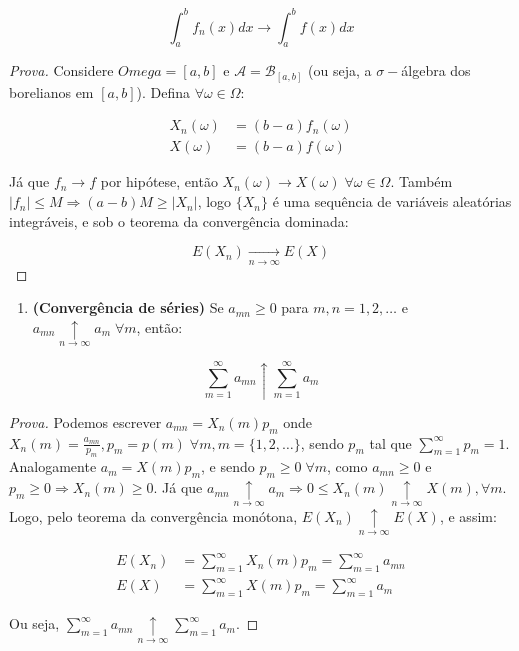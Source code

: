 \documentclass[
]{article}
\providecommand{\tightlist}{%
  \setlength{\itemsep}{0pt}\setlength{\parskip}{0pt}}
\theoremstyle{definition}
\theoremstyle{definition}
\theoremstyle{definition}
\theoremstyle{definition}
\theoremstyle{remark}
\begin{document}
\begin{equation*}
\int_{a}^{b}f_{n}(x)dx \to \int_{a}^{b}f(x)dx
\end{equation*}

\begin{proof}[Prova]
Considere \(Omega = [a,b]\) e \(\mathcal{A} = \mathcal{B}_{[a,b]}\) (ou seja, a \(\sigma-\)álgebra dos borelianos em \([a,b]\)). Defina \(\forall \omega \in \Omega\):

\begin{align*}
X_{n}(\omega) &= (b-a)f_{n}(\omega) \\
X(\omega) &= (b-a)f(\omega)
\end{align*}

Já que \(f_{n} \to f\) por hipótese, então \(X_{n}(\omega) \to X(\omega) \; \forall \omega \in \Omega\). Também \(|f_{n}| \le M \Rightarrow (a-b)M \ge |X_{n}|\), logo \(\{X_{n}\}\) é uma sequência de variáveis aleatórias integráveis, e sob o teorema da convergência dominada:

\begin{equation*}
E(X_{n}) \underset{n \to \infty}{\longrightarrow}E(X)
\end{equation*}
\end{proof}

\begin{enumerate}
\def\labelenumi{\arabic{enumi}.}
\setcounter{enumi}{3}
\tightlist
\item
  \textbf{(Convergência de séries)} Se \(a_{mn} \ge 0\) para \(m,n = 1,2,\ldots\) e \(a_{mn} \underset{n \to \infty}{\uparrow}a_{m} \; \forall m\), então:
\end{enumerate}

\begin{equation*}
\sum_{m=1}^{\infty}a_{mn} \uparrow \sum_{m=1}^{\infty}a_{m}
\end{equation*}

\begin{proof}[Prova]
Podemos escrever \(a_{mn} = X_{n}(m)p_{m}\) onde \(X_{n}(m) = \frac{a_{mn}}{p_{m}}, p_{m} = p(m) \; \forall m, m = \{1,2,\ldots\}\), sendo \(p_{m}\) tal que \(\sum_{m=1}^{\infty}p_{m} = 1\). Analogamente \(a_{m} = X(m)p_{m}\), e sendo \(p_{m} \ge 0 \; \forall m\), como \(a_{mn} \ge 0\) e \(p_{m} \ge 0 \Rightarrow X_{n}(m) \ge 0\). Já que \(a_{mn} \underset{n \to \infty}{\uparrow}a_{m} \Rightarrow 0 \le X_{n}(m) \underset{n \to \infty}{\uparrow} X(m), \forall m\). Logo, pelo teorema da convergência monótona, \(E(X_{n}) \underset{n \to \infty}{\uparrow} E(X)\), e assim:

\begin{align*}
E(X_{n}) &= \sum_{m=1}^{\infty}X_{n}(m)p_{m} = \sum_{m=1}^{\infty}a_{mn} \\
E(X) &= \sum_{m=1}^{\infty}X(m)p_{m} = \sum_{m=1}^{\infty}a_{m}
\end{align*}

Ou seja, \(\sum_{m=1}^{\infty}a_{mn} \underset{n \to \infty}{\uparrow} \sum_{m=1}^{\infty}a_{m}\).
\end{proof}
\end{document}

